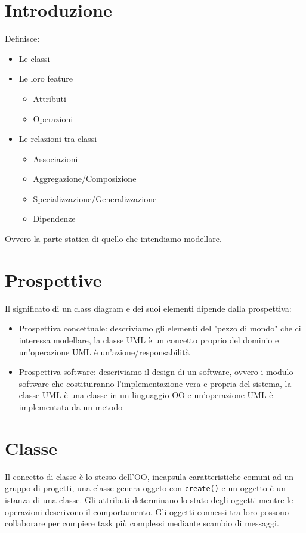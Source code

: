 \documentclass[12pt, a4paper]{report}
\begin{document}
\section{Introduzione}
Definisce:
\begin{itemize}
    \item Le classi
    \item Le loro feature \begin{itemize}
        \item Attributi
        \item Operazioni
    \end{itemize}
    \item Le relazioni tra classi \begin{itemize}
        \item Associazioni
        \item Aggregazione/Composizione
        \item Specializzazione/Generalizzazione
        \item Dipendenze
    \end{itemize}
\end{itemize}
Ovvero la parte statica di quello che intendiamo modellare.
\section{Prospettive}
Il significato di un class diagram e dei suoi elementi dipende dalla prospettiva:
\begin{itemize}
    \item Prospettiva concettuale: descriviamo gli elementi del "pezzo di mondo" che ci interessa modellare, la classe UML è un concetto proprio del dominio e un'operazione UML è un'azione/responsabilità
    \item Prospettiva software: descriviamo il design di un software, ovvero i modulo software che costituiranno l'implementazione vera e propria del sistema, la classe UML è una classe in un linguaggio OO e un'operazione UML è implementata da un metodo
\end{itemize}
\section{Classe}
Il concetto di classe è lo stesso dell'OO, incapsula caratteristiche comuni ad un gruppo di progetti, una classe genera oggeto con \texttt{create()} e un oggetto è un istanza di una classe. Gli attributi determinano lo stato degli oggetti mentre le operazioni descrivono il comportamento. Gli oggetti connessi tra loro possono collaborare per compiere task più complessi mediante scambio di messaggi.
\end{document}
